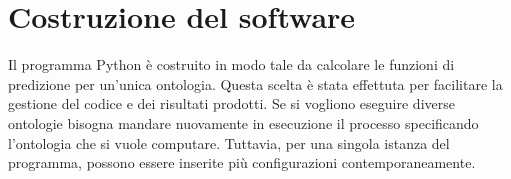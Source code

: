 \documentclass[12pt,a4paper,oneside,hidelinks]{report}
\begin{document}

\section{Costruzione del software}
Il programma Python è costruito in modo tale da calcolare le funzioni di predizione per un'unica ontologia. Questa scelta è stata effettuta per facilitare la gestione del codice e dei risultati prodotti. Se si vogliono eseguire diverse ontologie bisogna mandare nuovamente in esecuzione il processo specificando l'ontologia che si vuole computare.
Tuttavia, per una singola istanza del programma, possono essere inserite più configurazioni contemporaneamente.
\end{document}
